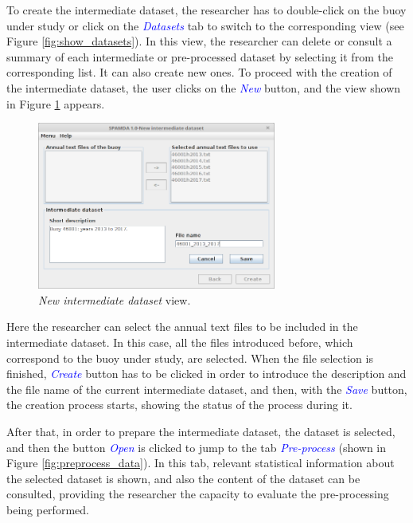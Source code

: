 \documentclass[energies,article,submit,moreauthors,pdftex]{Definitions/mdpi}
\begin{document}
		To create the intermediate dataset, the researcher has to double-click on the buoy under study or click on the \textcolor{blue}{\textit{Datasets}} tab to switch to the corresponding view (see Figure \ref{fig:show_datasets}). In this view, the researcher can delete or consult a summary of each intermediate or pre-processed dataset by selecting it from the corresponding list. It can also create new ones. To proceed with the creation of the intermediate dataset, the user clicks on the \textcolor{blue}{\textit{New}} button, and the view shown in Figure \ref{fig:intermediate} appears. 
		
		\begin{figure}[H]
			\centering
			\includegraphics[width=0.70\textwidth]{figures/FigureNew_intermediate_dataset.png}
			\caption{\textit{New intermediate dataset} view.}\label{fig:intermediate}
		\end{figure}
		
		Here the researcher can select the annual text files to be included in the intermediate dataset. In this case, all the files introduced before, which correspond to the buoy under study, are selected. When the file selection is finished, \textcolor{blue}{\textit{Create}} button has to be clicked in order to introduce the description and the file name of the current intermediate dataset, and then, with the \textcolor{blue}{\textit{Save}} button, the creation process starts, showing the status of the process during it.
		
		After that, in order to prepare the intermediate dataset, the dataset is selected, and then the button \textcolor{blue}{\textit{Open}} is clicked to jump to the tab \textcolor{blue}{\textit{Pre-process}} (shown in Figure \ref{fig:preprocess_data}). In this tab, relevant statistical information about the selected dataset is shown, and also the content of the dataset can be consulted, providing the researcher the capacity to evaluate the pre-processing being performed.
		
\end{document}
